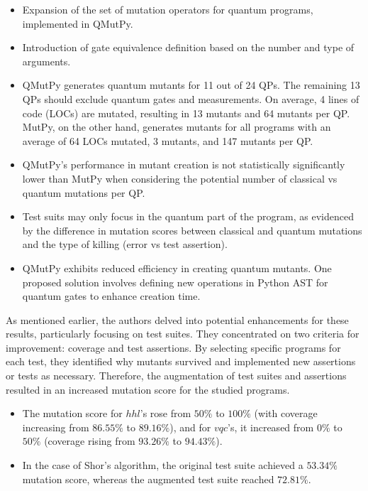 \begin{itemize}
\begin{itemize}
    \item Expansion of the set of mutation operators for quantum programs, implemented in QMutPy.
    \item Introduction of gate equivalence definition based on the number and type of arguments.
    \item QMutPy generates quantum mutants for 11 out of 24 QPs. The remaining 13 QPs should exclude quantum gates and measurements. On average, 4 lines of code (LOCs) are mutated, resulting in 13 mutants and 64 mutants per QP. MutPy, on the other hand, generates mutants for all programs with an average of 64 LOCs mutated, 3 mutants, and 147 mutants per QP.
    \item QMutPy's performance in mutant creation is not statistically significantly lower than MutPy when considering the potential number of classical vs quantum mutations per QP.
    \item Test suits may only focus in the quantum part of the program, as evidenced by the difference in mutation scores between classical and quantum mutations and the type of killing (error vs test assertion).
    \item QMutPy exhibits reduced efficiency in creating quantum mutants. One proposed solution involves defining new operations in Python AST for quantum gates to enhance creation time.
\end{itemize}

As mentioned earlier, the authors delved into potential enhancements for these results, particularly focusing on test suites. They concentrated on two criteria for improvement: coverage and test assertions. By selecting specific programs for each test, they identified why mutants survived and implemented new assertions or tests as necessary. Therefore, the augmentation of test suites and assertions resulted in an increased mutation score for the studied programs.

\begin{itemize}
    \item The mutation score for $hhl$’s rose from $50\%$ to $100\%$ (with coverage increasing from $86.55\%$ to $89.16\%$), and for $vqc$’s, it increased from $0\%$ to $50\%$ (coverage rising from $93.26\%$ to $94.43\%$).
    \item In the case of Shor's algorithm, the original test suite achieved a $53.34\%$ mutation score, whereas the augmented test suite reached $72.81\%$.
\end{itemize}


\end{itemize}
